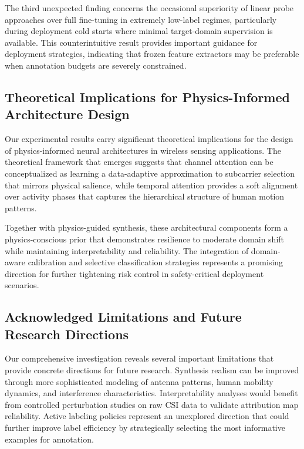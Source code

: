 \documentclass[journal]{IEEEtran}
\begin{document}
The third unexpected finding concerns the occasional superiority of linear probe approaches over full fine-tuning in extremely low-label regimes, particularly during deployment cold starts where minimal target-domain supervision is available. This counterintuitive result provides important guidance for deployment strategies, indicating that frozen feature extractors may be preferable when annotation budgets are severely constrained.

\subsection{Theoretical Implications for Physics-Informed Architecture Design}

Our experimental results carry significant theoretical implications for the design of physics-informed neural architectures in wireless sensing applications. The theoretical framework that emerges suggests that channel attention can be conceptualized as learning a data-adaptive approximation to subcarrier selection that mirrors physical salience, while temporal attention provides a soft alignment over activity phases that captures the hierarchical structure of human motion patterns.

Together with physics-guided synthesis, these architectural components form a physics-conscious prior that demonstrates resilience to moderate domain shift while maintaining interpretability and reliability. The integration of domain-aware calibration and selective classification strategies represents a promising direction for further tightening risk control in safety-critical deployment scenarios.

\subsection{Acknowledged Limitations and Future Research Directions}

Our comprehensive investigation reveals several important limitations that provide concrete directions for future research. Synthesis realism can be improved through more sophisticated modeling of antenna patterns, human mobility dynamics, and interference characteristics. Interpretability analyses would benefit from controlled perturbation studies on raw CSI data to validate attribution map reliability. Active labeling policies represent an unexplored direction that could further improve label efficiency by strategically selecting the most informative examples for annotation.
\end{document}
